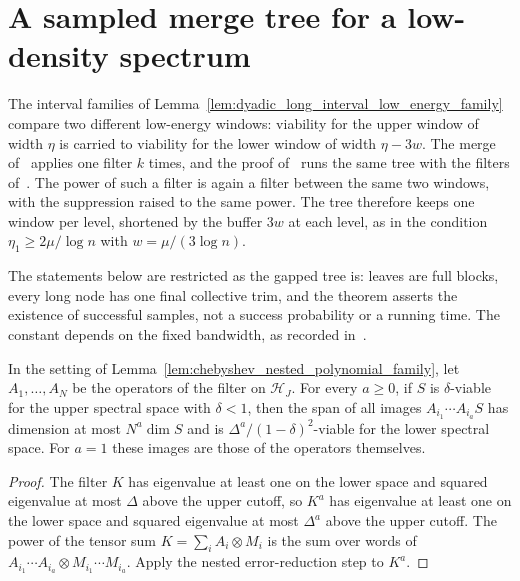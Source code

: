 \section{A sampled merge tree for a low-density spectrum}
\label{sec:physical_ld_tree}

The interval families of Lemma~\ref{lem:dyadic_long_interval_low_energy_family}
compare two different low-energy windows: viability for the upper window
of width $\eta$ is carried to viability for the lower window of width
$\eta-3w$. The merge of~\cite[Theorem~\texttt{t:alg1}, lines
    1777--1817]{Arad2016RigorousRG} applies one filter $k$ times, and the
proof of~\cite[Theorem~\texttt{t:alg2}, lines 1869--1878]{Arad2016RigorousRG}
runs the same tree with the filters
of~\cite[Theorem~\texttt{t:aisgapless}, lines 1027--1041]{Arad2016RigorousRG}.
The power of such a filter is again a filter between the same two windows,
with the suppression raised to the same power. The tree therefore keeps
one window per level, shortened by the buffer $3w$ at each level, as in the
condition $\eta_1\ge2\mu/\log n$ with $w=\mu/(3\log n)$.

The statements below are restricted as the gapped tree is: leaves are full
blocks, every long node has one final collective trim, and the theorem
asserts the existence of successful samples, not a success probability or a
running time. The constant depends on the fixed bandwidth, as recorded
in~\cite{gap:alvv16_low_energy_family_scope}.

\begin{lemma}
    \label{lem:chebyshev_nested_word_family}
    \leanok
    In the setting of Lemma~\ref{lem:chebyshev_nested_polynomial_family},
    let $A_1,\dots,A_N$ be the operators of the filter on $\mathcal H_J$.
    For every $a\ge0$, if $S$ is $\delta$-viable for the upper spectral
    space with $\delta<1$, then the span of all images
    $A_{i_1}\cdots A_{i_a}S$ has dimension at most $N^a\dim S$ and is
    $\Delta^a/(1-\delta)^2$-viable for the lower spectral space. For
    $a=1$ these images are those of the operators themselves.
\end{lemma}
\begin{proof}\leanok
    The filter $K$ has eigenvalue at least one on the lower space and
    squared eigenvalue at most $\Delta$ above the upper cutoff, so $K^a$
    has eigenvalue at least one on the lower space and squared eigenvalue
    at most $\Delta^a$ above the upper cutoff. The power of the tensor sum
    $K=\sum_iA_i\otimes M_i$ is the sum over words of
    $A_{i_1}\cdots A_{i_a}\otimes M_{i_1}\cdots M_{i_a}$. Apply the
    nested error-reduction step to $K^a$.
\end{proof}

